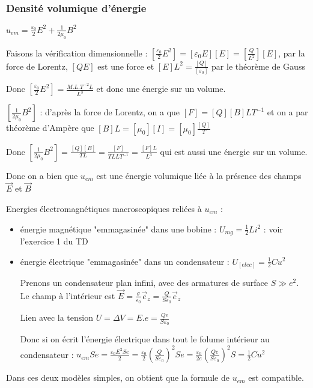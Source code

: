 \documentclass[a4paper,12pt]{book}
\begin{document}
\subsubsection{Densité volumique d'énergie}
$u_{em} = \frac{\varepsilon_0}{2}E^2 + \frac{1}{2\mu_0}B^2$
\par Faisons la vérification dimensionnelle : $\left[\frac{\varepsilon_0}{2}E^2\right] = [\varepsilon_0E][E]=\left[\frac{Q}{L^2}\right][E]$, par la force de Lorentz, $[QE]$ est une force et $[E]L^2 = \frac{[Q]}{[\varepsilon_0]}$ par le théorème de Gauss \par Donc $\left[\frac{\varepsilon_0}{2}E^2\right] = \frac{M.L.T^{-2}L}{L^3}$ et donc une énergie sur un volume.
\par $\left[\frac{1}{2\mu_0}B^2\right]$ : d'après la force de Lorentz, on a que $[F] = [Q][B]LT^{-1}$ et on a par théorème d'Ampère que $[B]L = [\mu_0][I] = [\mu_0]\frac{[Q]}{T}$ \par Donc $\left[\frac{1}{2\mu_0}B^2\right] =\frac{[Q][B]}{TL} = \frac{[F]}{TLLT^{-1}} = \frac{[F]L}{L^3}$ qui est aussi une énergie sur un volume.
\par Donc on a bien que $u_{em}$ est une énergie volumique liée à la présence des champs $\vec{E}$ et $\vec{B}$
\par Energies électromagnétiques macroscopiques reliées à $u_{em}$ :\begin{itemize}
\item énergie magnétique "emmagasinée" dans une bobine : $U_{mg} =\frac{1}{2}Li^2$ : voir l'exercice 1 du TD
\item énergie électrique "emmagasinée" dans un condensateur : $U_[elec]=\frac{1}{2}Cu^2$
\par Prenons un condensateur plan infini, avec des armatures de surface $S\gg e^2$. Le champ à l'intérieur est $\vec{E} = \frac{\sigma}{\varepsilon_0}\vec{e}_z = \frac{Q}{S\varepsilon_0}\vec{e}_z$ \par Lien avec la tension $U=\Delta V = E.e=\frac{Qe}{S\varepsilon_0}$ \par Donc si on écrit l'énergie électrique dans tout le folume intérieur au condensateur : $u_{em}Se = \frac{\varepsilon_0E^2Se}{2} = \frac{\varepsilon_0}{2}\left(\frac{Q}{S\varepsilon_0}\right)^2Se = \frac{\varepsilon_0}{2e}\left(\frac{Qe}{S\varepsilon_0}\right)^2S = \frac{1}{2}Cu^2$
\end{itemize}
Dans ces deux modèles simples, on obtient que la formule de $u_{em}$ est compatible.
\end{document}
